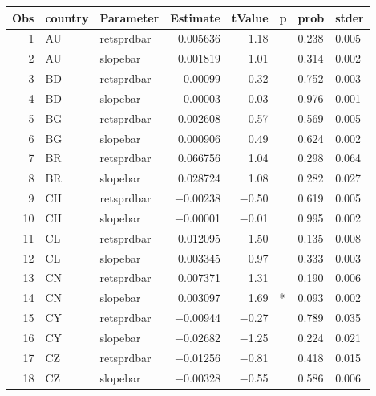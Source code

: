 

\begin{longtable}{|r|l|l|r|r|l|l|l|}\hline
   Obs &    country &    Parameter &    Estimate &    tValue &    p &    prob &    stder\\\hline
\endhead
   1 &    AU &    retsprdbar &    0.005636 &    1.18 &      &    0.238 &    0.005\\\hline
   2 &    AU &    slopebar &    0.001819 &    1.01 &      &    0.314 &    0.002\\\hline
   3 &    BD &    retsprdbar &    $-$0.00099 &    $-$0.32 &      &    0.752 &    0.003\\\hline
   4 &    BD &    slopebar &    $-$0.00003 &    $-$0.03 &      &    0.976 &    0.001\\\hline
   5 &    BG &    retsprdbar &    0.002608 &    0.57 &      &    0.569 &    0.005\\\hline
   6 &    BG &    slopebar &    0.000906 &    0.49 &      &    0.624 &    0.002\\\hline
   7 &    BR &    retsprdbar &    0.066756 &    1.04 &      &    0.298 &    0.064\\\hline
   8 &    BR &    slopebar &    0.028724 &    1.08 &      &    0.282 &    0.027\\\hline
   9 &    CH &    retsprdbar &    $-$0.00238 &    $-$0.50 &      &    0.619 &    0.005\\\hline
   10 &    CH &    slopebar &    $-$0.00001 &    $-$0.01 &      &    0.995 &    0.002\\\hline
   11 &    CL &    retsprdbar &    0.012095 &    1.50 &      &    0.135 &    0.008\\\hline
   12 &    CL &    slopebar &    0.003345 &    0.97 &      &    0.333 &    0.003\\\hline
   13 &    CN &    retsprdbar &    0.007371 &    1.31 &      &    0.190 &    0.006\\\hline
   14 &    CN &    slopebar &    0.003097 &    1.69 &    * &    0.093 &    0.002\\\hline
   15 &    CY &    retsprdbar &    $-$0.00944 &    $-$0.27 &      &    0.789 &    0.035\\\hline
   16 &    CY &    slopebar &    $-$0.02682 &    $-$1.25 &      &    0.224 &    0.021\\\hline
   17 &    CZ &    retsprdbar &    $-$0.01256 &    $-$0.81 &      &    0.418 &    0.015\\\hline
   18 &    CZ &    slopebar &    $-$0.00328 &    $-$0.55 &      &    0.586 &    0.006\\\hline

\end{longtable}
